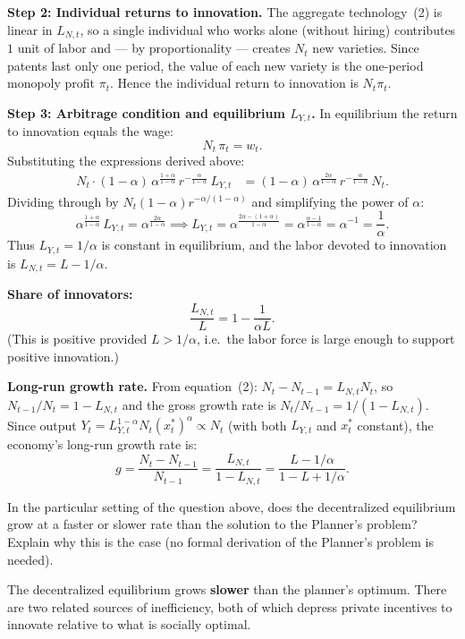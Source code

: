 \documentclass[11pt]{exam}
\begin{document}
\begin{questions}
\begin{solution}
\textbf{Step 2: Individual returns to innovation.}
The aggregate technology~(2) is linear in $L_{N,t}$, so a single individual who works alone (without hiring) contributes $1$ unit of labor and — by proportionality — creates $N_{t}$ new varieties.  Since patents last only one period, the value of each new variety is the one-period monopoly profit $\pi_{t}$.  Hence the individual return to innovation is $N_{t}\pi_{t}$.

\textbf{Step 3: Arbitrage condition and equilibrium $L_{Y,t}$.}
In equilibrium the return to innovation equals the wage:
\[
	N_{t}\,\pi_{t} = w_{t}.
\]
Substituting the expressions derived above:
\begin{align*}
	N_{t}\cdot(1-\alpha)\,\alpha^{\frac{1+\alpha}{1-\alpha}}\,r^{-\frac{\alpha}{1-\alpha}}\,L_{Y,t}
	&= (1-\alpha)\,\alpha^{\frac{2\alpha}{1-\alpha}}\,r^{-\frac{\alpha}{1-\alpha}}\,N_{t}.
\end{align*}
Dividing through by $N_{t}(1-\alpha)r^{-\alpha/(1-\alpha)}$ and simplifying the power of $\alpha$:
\[
	\alpha^{\frac{1+\alpha}{1-\alpha}}\,L_{Y,t} = \alpha^{\frac{2\alpha}{1-\alpha}}
	\implies L_{Y,t} = \alpha^{\frac{2\alpha-(1+\alpha)}{1-\alpha}} = \alpha^{\frac{\alpha-1}{1-\alpha}} = \alpha^{-1} = \frac{1}{\alpha}.
\]
Thus $L_{Y,t}=1/\alpha$ is constant in equilibrium, and the labor devoted to innovation is $L_{N,t}=L-1/\alpha$.

\textbf{Share of innovators:}
\[
	\frac{L_{N,t}}{L} = 1 - \frac{1}{\alpha L}.
\]
(This is positive provided $L>1/\alpha$, i.e.\ the labor force is large enough to support positive innovation.)

\textbf{Long-run growth rate.}
From equation~(2): $N_{t}-N_{t-1}=L_{N,t}N_{t}$, so $N_{t-1}/N_{t}=1-L_{N,t}$ and the gross growth rate is $N_{t}/N_{t-1}=1/(1-L_{N,t})$.  Since output $Y_{t}=L_{Y,t}^{1-\alpha}N_{t}(x_{t}^{*})^{\alpha}\propto N_{t}$ (with both $L_{Y,t}$ and $x_{t}^{*}$ constant), the economy's long-run growth rate is:
\[
	\boxed{g = \frac{N_{t}-N_{t-1}}{N_{t-1}} = \frac{L_{N,t}}{1-L_{N,t}} = \frac{L-1/\alpha}{1-L+1/\alpha}.}
\]
\end{solution}

\question In the particular setting of the question above, does the decentralized equilibrium grow at a faster or slower rate than the solution to the Planner's problem? Explain why this is the case (no formal derivation of the Planner's problem is needed).
\begin{solution}
The decentralized equilibrium grows \textbf{slower} than the planner's optimum.  There are two related sources of inefficiency, both of which depress private incentives to innovate relative to what is socially optimal.


\end{solution}
\end{questions}
\end{document}
